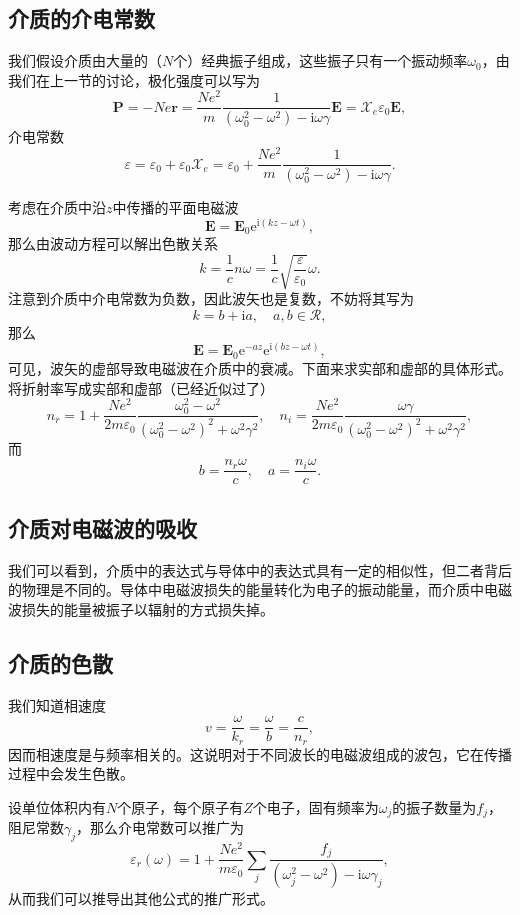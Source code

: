 \documentclass[UTF8]{ctexbook}
\newcommand{\e}{\mathrm{e}}
\renewcommand{\b}{\boldsymbol}
\renewcommand{\i}{\mathrm{i}}
\numberwithin{equation}{chapter}
\begin{document}
	\subsection{介质的介电常数}
	我们假设介质由大量的（$N$个）经典振子组成，这些振子只有一个振动频率$\omega_0$，由我们在上一节的讨论，极化强度可以写为
	\[\b{P}=-Ne\b{r}=\frac{Ne^2}{m}\frac{1}{(\omega_0^2-\omega^2)-\i\omega\gamma}\b{E}=\mathcal{X}_e\varepsilon_0\b{E},\]
	介电常数
	\[\varepsilon=\varepsilon_0+\varepsilon_0\mathcal{X}_e=\varepsilon_0+\frac{Ne^2}{m}\frac{1}{(\omega_0^2-\omega^2)-\i\omega\gamma}.\]
	
	考虑在介质中沿$z$中传播的平面电磁波
	\[\b{E}=\b{E}_0\e^{\i(kz-\omega t)},\]
	那么由波动方程可以解出色散关系
	\[k=\frac{1}{c}n\omega=\frac{1}{c}\sqrt{\frac{\varepsilon}{\varepsilon_0}}\omega.\]
	注意到介质中介电常数为负数，因此波矢也是复数，不妨将其写为
	\[k=b+\i a,\quad a,b\in \mathcal{R},\]
	那么
	\[\b{E}=\b{E}_0\e^{-az}\e^{\i(bz-\omega t)},\]
	可见，波矢的虚部导致电磁波在介质中的衰减。下面来求实部和虚部的具体形式。将折射率写成实部和虚部（已经近似过了）
	\[n_r=1+\frac{Ne^2}{2m\varepsilon_0}\frac{\omega_0^2-\omega^2}{(\omega_0^2-\omega^2)^2+\omega^2\gamma^2},\quad n_i=\frac{N e^2}{2m\varepsilon_0}\frac{\omega \gamma}{(\omega_0^2-\omega^2)^2+\omega^2\gamma^2},\]
	而
	\[b=\frac{n_r\omega}{c},\quad a=\frac{n_i\omega}{c}.\]
	
	\subsection{介质对电磁波的吸收}
	
	我们可以看到，介质中的表达式与导体中的表达式具有一定的相似性，但二者背后的物理是不同的。导体中电磁波损失的能量转化为电子的振动能量，而介质中电磁波损失的能量被振子以辐射的方式损失掉。
	
	\subsection{介质的色散}
	
	我们知道相速度
	\[v=\frac{\omega}{k_r}=\frac{\omega }{b}=\frac{c}{n_r},\]
	因而相速度是与频率相关的。这说明对于不同波长的电磁波组成的波包，它在传播过程中会发生色散。	
	
	设单位体积内有$N$个原子，每个原子有$Z$个电子，固有频率为$\omega_j$的振子数量为$f_j$，阻尼常数$\gamma_j$，那么介电常数可以推广为
	\[\varepsilon_r(\omega)=1+\frac{Ne^2}{m\varepsilon_0}\sum_j\frac{f_j}{(\omega_j^2-\omega^2)-\i\omega\gamma_j},\]
	从而我们可以推导出其他公式的推广形式。
	
	
	
	
	
	
	
	
	
	
	
	
	
\end{document}

